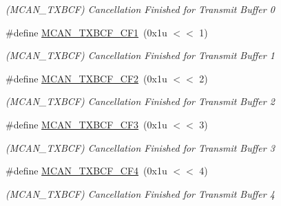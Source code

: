 \begin{DoxyCompactItemize}
\begin{DoxyCompactList}\small\item\em (M\+C\+A\+N\+\_\+\+T\+X\+B\+CF) Cancellation Finished for Transmit Buffer 0 \end{DoxyCompactList}\item 
\mbox{\label{group__SAME70__MCAN_gaecbe95022c50ad8e54d0f206105146c5}} 
\#define \mbox{\hyperlink{group__SAME70__MCAN_gaecbe95022c50ad8e54d0f206105146c5}{M\+C\+A\+N\+\_\+\+T\+X\+B\+C\+F\+\_\+\+C\+F1}}~(0x1u $<$$<$ 1)
\begin{DoxyCompactList}\small\item\em (M\+C\+A\+N\+\_\+\+T\+X\+B\+CF) Cancellation Finished for Transmit Buffer 1 \end{DoxyCompactList}\item 
\mbox{\label{group__SAME70__MCAN_gae8b8a60df1b786b077b9dc74b6fc7f5f}} 
\#define \mbox{\hyperlink{group__SAME70__MCAN_gae8b8a60df1b786b077b9dc74b6fc7f5f}{M\+C\+A\+N\+\_\+\+T\+X\+B\+C\+F\+\_\+\+C\+F2}}~(0x1u $<$$<$ 2)
\begin{DoxyCompactList}\small\item\em (M\+C\+A\+N\+\_\+\+T\+X\+B\+CF) Cancellation Finished for Transmit Buffer 2 \end{DoxyCompactList}\item 
\mbox{\label{group__SAME70__MCAN_ga03a0e0de00a8616558cd1272a06f2fe1}} 
\#define \mbox{\hyperlink{group__SAME70__MCAN_ga03a0e0de00a8616558cd1272a06f2fe1}{M\+C\+A\+N\+\_\+\+T\+X\+B\+C\+F\+\_\+\+C\+F3}}~(0x1u $<$$<$ 3)
\begin{DoxyCompactList}\small\item\em (M\+C\+A\+N\+\_\+\+T\+X\+B\+CF) Cancellation Finished for Transmit Buffer 3 \end{DoxyCompactList}\item 
\mbox{\label{group__SAME70__MCAN_ga473c1612c389279d19708c31ffbb1088}} 
\#define \mbox{\hyperlink{group__SAME70__MCAN_ga473c1612c389279d19708c31ffbb1088}{M\+C\+A\+N\+\_\+\+T\+X\+B\+C\+F\+\_\+\+C\+F4}}~(0x1u $<$$<$ 4)
\begin{DoxyCompactList}\small\item\em (M\+C\+A\+N\+\_\+\+T\+X\+B\+CF) Cancellation Finished for Transmit Buffer 4 \end{DoxyCompactList}\item 

\end{DoxyCompactItemize}
